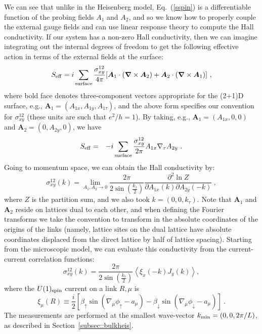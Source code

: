  We can see that unlike in the Heisenberg model, Eq.~(\ref{sspin}) is a differentiable function of the probing fields $A_1$ and $A_2$, and so we know how to properly couple the external gauge fields and can use linear response theory to compute the Hall conductivity. If our system has a non-zero Hall conductivity, then we can imagine integrating out the internal degrees of freedom to get the following effective action in terms of the external fields at the surface:
\begin{equation}
S_{\rm eff} = i \sum_{\rm surface} 
\frac{\sigma_{xy}^{12}}{4\pi} [{\bm A}_1 \cdot ({\bm \nabla} \times {\bm A}_2) + {\bm A}_2 \cdot ({\bm \nabla} \times {\bm A}_1)] ~,
\label{Seff}
\end{equation}
where bold face denotes three-component vectors appropriate for the (2+1)D surface, e.g., ${\bm A}_1 = (A_{1x}, A_{1y}, A_{1\tau})$, and the above form specifies our convention for $\sigma^{12}_{xy}$ (these units are such that $e^2/h=1$).  By taking, e.g., ${\bm A}_1 = (A_{1x}, 0, 0)$ and ${\bm A}_2 = (0, A_{2y}, 0)$, we have
\begin{eqnarray}
S_{\rm eff} &=& -i \sum_{\rm surface} \frac{\sigma_{xy}^{12}}{2\pi} A_{1x} \nabla_\tau A_{2y} ~.
\end{eqnarray}
Going to momentum space, we can obtain the Hall conductivity by:
\begin{equation}
\sigma_{xy}^{12}(k) = \lim_{A_1,A_2 \to 0} \frac{2\pi}{2 \sin(\frac{k_\tau}{2})}\frac{\partial^2 \ln Z}{\partial A_{1x}(k) \partial A_{2y}(-k)} ~,
\end{equation}
where $Z$ is the partition sum, and we also took $k = (0, 0, k_\tau)$.  Note that ${\bm A}_1$ and ${\bm A}_2$ reside on lattices dual to each other, and when defining the Fourier transforms we take the convention to transform in the absolute coordinates of the origins of the links (namely, lattice sites on the dual lattice have absolute coordinates displaced from the direct lattice by half of lattice spacing). 
Starting from the microscopic model, we can evaluate this conductivity from the current-current correlation functions:
\begin{equation}
\sigma_{xy}^{12}(k)=\frac{2\pi}{2\sin(\frac{k_\tau}{2})} \left\langle\xi_x(-k) J_y(k) \right\rangle,
\end{equation}
where the $U(1)_{\rm spin}$ current on a link $R,\mu$ is
\begin{equation}
\xi_\mu(R)\equiv\frac{i}{2}\left[\beta_\uparrow\sin(\nabla_\mu\phi_\uparrow-a_\mu)-\beta_\downarrow\sin(\nabla_\mu\phi_\downarrow-a_\mu)\right]\nonumber ~.
\end{equation}
The measurements are performed at the smallest wave-vector $k_{\rm min}=(0,0, 2\pi/L)$, as described in Section~\ref{subsec::bulkheis}. 

